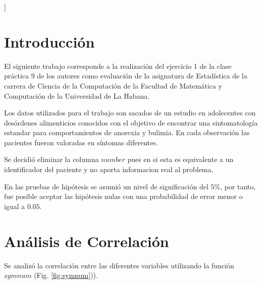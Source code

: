 \documentclass[a4paper,10pt,twocolumn]{article}
\begin{document}
\vspace{0.8cm}
]



\section{Introducción}\label{sec:intro}

El siguiente trabajo corresponde a la realización del ejercicio 1 de la clase práctica 9 de los autores como evaluación de la asignatura de Estadística de la carrera de Ciencia de la Computación de la Facultad de Matemática y Computación de la Universidad de La Habana.

Los datos utilizados para el trabajo son sacados de un estudio en adolecentes con desórdenes alimenticios conocidos con el objetivo de encontrar una sintomatología estandar para comportamientos de anorexia y bulimia. En cada observación las pacientes fueron valoradas en síntomas diferentes.

Se decidió eliminar la columna $number$ pues en si esta es equivalente a un identificador del paciente y no aporta informacion real al problema.

En las pruebas de hipótesis se asumió un nivel de significación del $5\%$, por tanto, fue posible aceptar las hipótesis nulas con una probabilidad de error menor o igual a $0.05$.

\section{Análisis de Correlación}\label{sec:ana_cor}


Se analizó la correlación entre las diferentes variables utilizando la función $symnum$ (Fig. \ref{fig:symnum})).
\end{document}
